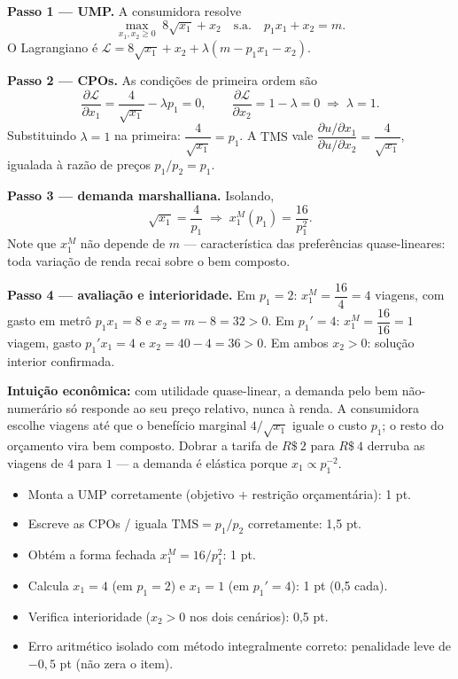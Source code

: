 \begin{solucao}
\textbf{Passo 1 — UMP.} A consumidora resolve
\[
\max_{x_1,x_2\ge 0}\; 8\sqrt{x_1}+x_2 \quad\text{s.a.}\quad p_1 x_1+x_2=m.
\]
O Lagrangiano é $\mathcal{L}=8\sqrt{x_1}+x_2+\lambda(m-p_1 x_1-x_2)$.

\textbf{Passo 2 — CPOs.} As condições de primeira ordem são
\[
\frac{\partial\mathcal{L}}{\partial x_1}=\frac{4}{\sqrt{x_1}}-\lambda p_1=0,\qquad \frac{\partial\mathcal{L}}{\partial x_2}=1-\lambda=0\;\Rightarrow\;\lambda=1.
\]
Substituindo $\lambda=1$ na primeira: $\dfrac{4}{\sqrt{x_1}}=p_1$. A $\text{TMS}$ vale $\dfrac{\partial u/\partial x_1}{\partial u/\partial x_2}=\dfrac{4}{\sqrt{x_1}}$, igualada à razão de preços $p_1/p_2=p_1$.

\textbf{Passo 3 — demanda marshalliana.} Isolando,
\[
\sqrt{x_1}=\frac{4}{p_1}\;\Rightarrow\; x_1^{M}(p_1)=\frac{16}{p_1^{2}}.
\]
Note que $x_1^{M}$ não depende de $m$ — característica das preferências quase-lineares: toda variação de renda recai sobre o bem composto.

\textbf{Passo 4 — avaliação e interioridade.} Em $p_1=2$: $x_1^{M}=\dfrac{16}{4}=4$ viagens, com gasto em metrô $p_1 x_1=8$ e $x_2=m-8=32>0$. Em $p_1'=4$: $x_1^{M}=\dfrac{16}{16}=1$ viagem, gasto $p_1' x_1=4$ e $x_2=40-4=36>0$. Em ambos $x_2>0$: solução interior confirmada.

\textbf{Intuição econômica:} com utilidade quase-linear, a demanda pelo bem não-numerário só responde ao seu preço relativo, nunca à renda. A consumidora escolhe viagens até que o benefício marginal $4/\sqrt{x_1}$ iguale o custo $p_1$; o resto do orçamento vira bem composto. Dobrar a tarifa de $R\$~2$ para $R\$~4$ derruba as viagens de $4$ para $1$ — a demanda é elástica porque $x_1\propto p_1^{-2}$.
\rubricalabel
\begin{itemize}
\item Monta a UMP corretamente (objetivo $+$ restrição orçamentária): 1 pt.
\item Escreve as CPOs / iguala $\text{TMS}=p_1/p_2$ corretamente: 1{,}5 pt.
\item Obtém a forma fechada $x_1^{M}=16/p_1^{2}$: 1 pt.
\item Calcula $x_1=4$ (em $p_1=2$) e $x_1=1$ (em $p_1'=4$): 1 pt (0{,}5 cada).
\item Verifica interioridade ($x_2>0$ nos dois cenários): 0{,}5 pt.
\item Erro aritmético isolado com método integralmente correto: penalidade leve de $-0{,}5$ pt (não zera o item).
\end{itemize}
\end{solucao}

